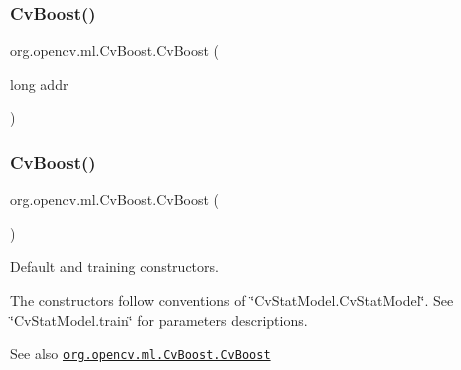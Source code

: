 \subsubsection{\texorpdfstring{Cv\+Boost()}{CvBoost()}\hspace{0.1cm}{\footnotesize\ttfamily [1/4]}}
{\footnotesize\ttfamily org.\+opencv.\+ml.\+Cv\+Boost.\+Cv\+Boost (\begin{DoxyParamCaption}\item[{long}]{addr }\end{DoxyParamCaption})\hspace{0.3cm}{\ttfamily [protected]}}

\mbox{\label{classorg_1_1opencv_1_1ml_1_1_cv_boost_a7ccc8580af0866ddaaba2842dc1d5cb2}} 
\subsubsection{\texorpdfstring{Cv\+Boost()}{CvBoost()}\hspace{0.1cm}{\footnotesize\ttfamily [2/4]}}
{\footnotesize\ttfamily org.\+opencv.\+ml.\+Cv\+Boost.\+Cv\+Boost (\begin{DoxyParamCaption}{ }\end{DoxyParamCaption})}

Default and training constructors.

The constructors follow conventions of \char`\"{}\+Cv\+Stat\+Model.\+Cv\+Stat\+Model\char`\"{}. See \char`\"{}\+Cv\+Stat\+Model.\+train\char`\"{} for parameters descriptions.

\begin{DoxySeeAlso}{See also}
\href{http://docs.opencv.org/modules/ml/doc/boosting.html#cvboost-cvboost}{\tt org.\+opencv.\+ml.\+Cv\+Boost.\+Cv\+Boost} 
\end{DoxySeeAlso}
\mbox{\label{classorg_1_1opencv_1_1ml_1_1_cv_boost_a3e5a0bc801060bef92562e993ce2df83}} 
